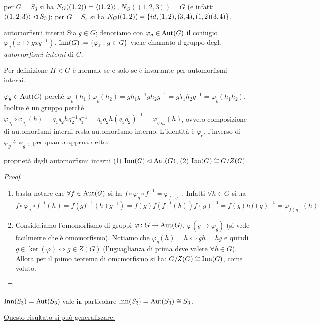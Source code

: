 \begin{example}
    per $G = S_3$ si ha $N_G((1,2)) = \langle (1,2) \rangle$, $N_G((1,2,3)) = G$ (e infatti $\langle (1,2,3) \rangle \vartriangleleft S_3$); per $G = S_4$ si ha $N_G((1,2)) = \left\{ id,(1,2),(3,4),(1,2)(3,4) \right\}$.
\end{example}
\begin{definition}{automorfismi interni}
    Sia $g \in G$; denotiamo con $\varphi_g \in \text{Aut}(G)$ il coniugio $\varphi_g(x \mapsto gxg^{-1})$. $\text{Inn}(G) := \{\varphi_g : g \in G\}$ viene chiamato il gruppo degli \textit{automorfismi interni} di $G$.
\end{definition}
Per definizione $H < G$ è normale se e solo se è invariante per automorfismi interni.
\begin{bdef}
    $\varphi_g \in \text{Aut}(G)$ perché $\varphi_g(h_1)\varphi_g(h_2) = gh_1g^{-1}gh_2g^{-1} = gh_1h_2g^{-1} = \varphi_g(h_1h_2)$. Inoltre è un gruppo perché $\varphi_{g_1}\circ\varphi_{g_2}(h) = g_1g_2hg_2^{-1}g_1^{-1} = g_1g_2h(g_1g_2)^{-1} = \varphi_{g_1g_2}(h)$, ovvero composizione di automorfismi interni resta automorfismo interno. L'identità è $\varphi_e$, l'inverso di $\varphi_g$ è $\varphi_{g^{-1}}$ per quanto appena detto.
\end{bdef}
\begin{proposition}{proprietà degli automorfismi interni}
    (1) $\text{Inn}(G) \lhd \text{Aut}(G)$, (2) $\text{Inn}(G) \cong G/Z(G)$
\end{proposition}
\begin{proof} 
    \begin{enumerate}
    \item[(1)] basta notare che $\forall f \in \text{Aut}(G)$ si ha $f \circ \varphi_g \circ f^{-1} = \varphi_{f(g)}$. Infatti $\forall h \in G$ si ha $f \circ \varphi_g \circ f^{-1}(h) = f(gf^{-1}(h)g^{-1}) = f(g)f(f^{-1}(h))f(g)^{-1} = f(g)hf(g)^{-1} = \varphi_{f(g)}(h)$
    \item[(2)] Consideriamo l'omomorfismo di gruppi $\varphi: G \rightarrow \text{Aut}(G)$, $\varphi(g \mapsto \varphi_g)$ (si vede facilmente che è omomorfismo). Notiamo che $\varphi_g(h) = h \iff gh = hg$ e quindi $g \in \ker(\varphi) \iff g \in Z(G)$ (l'uguaglianza di prima deve valere $\forall h \in G$). Allora per il primo teorema di omomorfismo si ha: $G/Z(G) \cong \text{Inn}(G)$, come voluto. 
    \end{enumerate}
    \end{proof}
\begin{example2}{\normalfont $\text{Inn}(S_3) = \text{Aut}(S_3)$}
    vale in particolare  $\text{Inn}(S_3) = \text{Aut}(S_3) \cong S_3$.

    \hyperlink{InnSn}{Questo risultato si può generalizzare.}
\end{example2}
